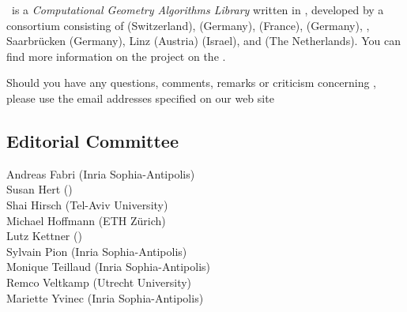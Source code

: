 
\cgal\ is a {\em Computational Geometry Algorithms Library} written in \CC, 
developed by a consortium consisting of
 (Switzerland), 
 (Germany), 
 (France),
 (Germany),
,
Saarbr\"ucken (Germany),
 Linz (Austria)
 (Israel), and
 (The Netherlands). 
You can find more information on the project on the 
.

Should you have any questions, comments, remarks or criticism concerning 
\cgal, please use the email addresses specified on our web site


\subsection*{Editorial Committee}

Andreas Fabri ({\sc Inria} Sophia-Antipolis) \\
Susan Hert ()\\
Shai Hirsch (Tel-Aviv University) \\
Michael Hoffmann (ETH Z\"urich) \\
Lutz Kettner ()\\
Sylvain Pion ({\sc Inria} Sophia-Antipolis)\\
Monique Teillaud ({\sc Inria} Sophia-Antipolis)\\
Remco Veltkamp (Utrecht University)\\
Mariette Yvinec ({\sc Inria} Sophia-Antipolis)\\

